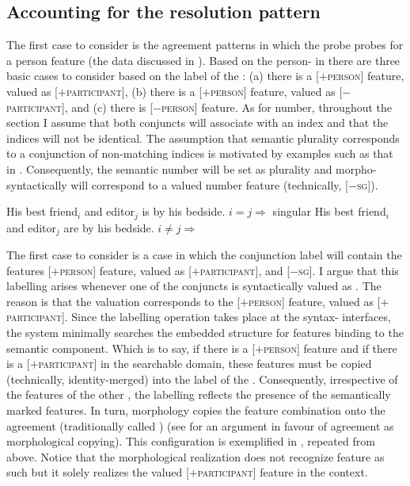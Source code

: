 \documentclass[output=paper,modfontsnewtxmath,hidelinks]{langscibook}
\begin{document}
\subsection{Accounting for the resolution pattern}

The first case to consider is the agreement patterns in which the probe probes for a person feature (the data discussed in ). Based on the person- in  there are three basic cases to consider based on the label of the : (a) there is a [$+$\textsc{person}] feature, valued as [$+$\textsc{participant}], (b) there is a [$+$\textsc{person}] feature, valued as [$-$\textsc{participant}], and (c) there is [$-$\textsc{person}] feature. As for number, throughout the section I assume that both conjuncts will associate with an index and that the indices will not be identical. The assumption that semantic plurality corresponds to a conjunction of non-matching indices is motivated by examples such as that in . Consequently, the semantic number will be set as plurality and morpho-syntactically will correspond to a valued number feature (technically, [$-$\textsc{sg}]).

\ea\label{plural}
\ea His best friend$_i$ and editor$_j$ is by his bedside. \hfill $i=j \Rightarrow$ singular
\ex His best friend$_i$ and editor$_j$ are by his bedside. \hfill $i \neq j \Rightarrow$  
\z\z

\largerpage
\noindent The first case to consider is a case in which the conjunction label will contain the features [$+$\textsc{person}] feature, valued as [$+$\textsc{participant}], and [$-$\textsc{sg}]. I argue that this labelling arises whenever one of the conjuncts is syntactically valued as  . The reason is that the   valuation corresponds to the  [$+$\textsc{person}] feature, valued as [$+$\textsc{participant}]. Since the labelling operation takes place at the syntax- interfaces, the system minimally searches the embedded structure for features binding to the semantic component. Which is to say, if there is a [$+$\textsc{person}] feature and if there is a [$+$\textsc{participant}] in the searchable domain, these features must be copied (technically, identity-merged) into the label of the . Consequently, irrespective of the features of the other , the labelling reflects the presence of the semantically marked features. In turn, morphology copies the feature combination onto the   agreement (traditionally called   ) (see \citealt{bhattwalkow13} for an argument in favour of agreement as morphological copying). This configuration is exemplified in , repeated from  above. Notice that the morphological realization does not recognize   feature as such but it solely realizes the valued [$+$\textsc{participant}] feature in the  context.
\end{document}
